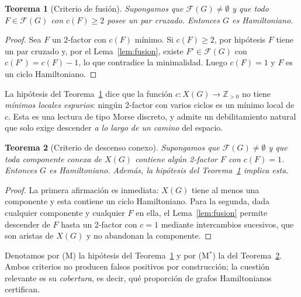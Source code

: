 \documentclass[11pt,a4paper]{article}
\newtheorem{teorema}{Teorema}[section]
\theoremstyle{definition}
\theoremstyle{remark}
\begin{document}
\begin{teorema}[Criterio de fusión]\label{thm:fusion}
Supongamos que $\mathcal{F}(G)\neq\emptyset$ y que todo $F\in\mathcal{F}(G)$ con $c(F)\ge2$ posee un par cruzado. Entonces $G$ es Hamiltoniano.
\end{teorema}

\begin{proof}
Sea $F$ un 2-factor con $c(F)$ mínimo. Si $c(F)\ge2$, por hipótesis $F$ tiene un par cruzado y, por el Lema~\ref{lem:fusion}, existe $F'\in\mathcal{F}(G)$ con $c(F')=c(F)-1$, lo que contradice la minimalidad. Luego $c(F)=1$ y $F$ es un ciclo Hamiltoniano.
\end{proof}

La hipótesis del Teorema~\ref{thm:fusion} dice que la función $c:X(G)\to\mathbb{Z}_{>0}$ no tiene \emph{mínimos locales espurios}: ningún 2-factor con varios ciclos es un mínimo local de $c$. Esta es una lectura de tipo Morse discreto, y admite un debilitamiento natural que solo exige descender \emph{a lo largo de un camino} del espacio.

\begin{teorema}[Criterio de descenso conexo]\label{thm:descenso}
Supongamos que $\mathcal{F}(G)\neq\emptyset$ y que toda componente conexa de $X(G)$ contiene algún 2-factor $F$ con $c(F)=1$. Entonces $G$ es Hamiltoniano. Además, la hipótesis del Teorema~\ref{thm:fusion} implica esta.
\end{teorema}

\begin{proof}
La primera afirmación es inmediata: $X(G)$ tiene al menos una componente y esta contiene un ciclo Hamiltoniano. Para la segunda, dada cualquier componente y cualquier $F$ en ella, el Lema~\ref{lem:fusion} permite descender de $F$ hasta un 2-factor con $c=1$ mediante intercambios sucesivos, que son aristas de $X(G)$ y no abandonan la componente.
\end{proof}

Denotamos por (M) la hipótesis del Teorema~\ref{thm:fusion} y por (M$^*$) la del Teorema~\ref{thm:descenso}. Ambos criterios no producen falsos positivos por construcción; la cuestión relevante es su \emph{cobertura}, es decir, qué proporción de grafos Hamiltonianos certifican.
\end{document}
